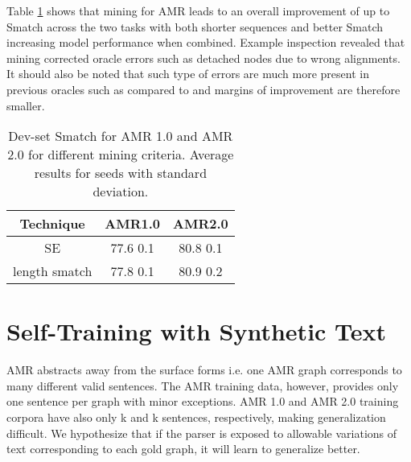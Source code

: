 \documentclass[11pt,a4paper]{article}
\begin{document}
Table \ref{tab:miningovergold} shows that mining for AMR leads to an overall improvement of up to  Smatch across the two tasks with both shorter sequences and better Smatch increasing model performance when combined. Example inspection revealed that mining corrected oracle errors such as detached nodes due to wrong alignments. It should also be noted that such type of errors are much more present in previous oracles such as \cite{naseem-etal-2019-rewarding} compared to \cite{anon2020a} and margins of improvement are therefore smaller.



\begin{table}[h]
    \centering
    \fontsize{10pt}{12pt}\selectfont
    \setlength{\tabcolsep}{2.0pt}
    \begin{tabular}{c | c | c }
        Technique & AMR1.0 & AMR2.0 \\
        \hline
        \cite{anon2020a}SE & 77.6 \footnotesize{0.1}   & 80.8 \footnotesize{0.1}   \\
        \hline
 length   smatch  & 77.8 \footnotesize{0.1} & 80.9 \footnotesize{0.2}\\
        \hline
    \end{tabular}
    \caption{Dev-set Smatch for AMR 1.0 and AMR 2.0 for different mining criteria. Average results for  seeds with standard deviation.}
    \label{tab:miningovergold}
\end{table}
 
\section{Self-Training with Synthetic Text}
\label{section:synthetictext}
AMR abstracts away from the surface forms i.e. one AMR graph corresponds to many different valid sentences. The AMR training data, however, provides only one sentence per graph with minor exceptions. AMR 1.0 and AMR 2.0 training corpora have also only k and k sentences, respectively, making generalization difficult. We hypothesize that if the parser is exposed to allowable variations of text corresponding to each gold graph, it will learn to generalize better.
\end{document}
